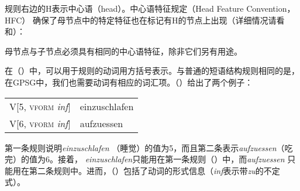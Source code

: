 规则右边的H表示中心语（head）。中心语特征规定（Head Feature Convention，HFC） 确保了母节点中的特定特征也在标记有H的节点上出现（详细情况请看\citealp*[Section~5.4]{GKPS85a}和\citealp[67]{Uszkoreit87a}）：
\begin{principle-break}
母节点与子节点必须具有相同的中心语特征，除非它们另有用途。
\end{principle-break}
%
在（）中，可以用于规则的动词用方括号表示。与普通的短语结构规则相同的是，在GPSG中，我们也需要动词有相应的词汇项。（）给出了两个例子：
\ea
\begin{tabular}[t]{@{}l@{~$\to$~}l@{}}
V[5, \textsc{vform} \emph{inf}]  & einzuschlafen\\
V[6, \textsc{vform} \emph{inf}]  & aufzuessen\\
\end{tabular}
\z
第一条规则说明\emph{einzuschlafen} （睡觉）的\subcat 值为5，而且第二条表示\emph{aufzuessen}（吃完）的\subcat 值为6。接着， \emph{einzuschlafen}只能用在第一条规则（）中，而\emph{aufzuessen} 只能用在第二条规则中。进而，（）包括了动词的形式信息（\emph{inf}表示带\emph{zu}的不定式）。

